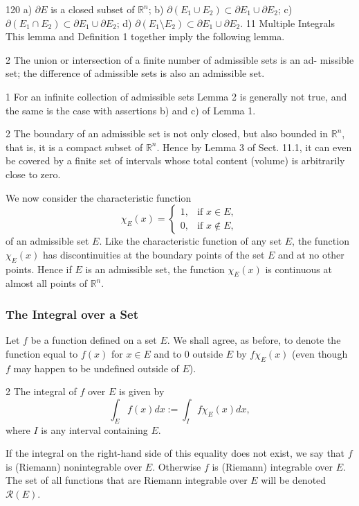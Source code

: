 120
a) $\partial E$ is a closed subset of $\mathbb{R}^n$;
b) $\partial(E_1 \cup E_2) \subset \partial E_1 \cup \partial E_2$;
c) $\partial(E_1 \cap E_2) \subset \partial E_1 \cup \partial E_2$;
d) $\partial(E_1 \setminus E_2) \subset \partial E_1 \cup \partial E_2$.
11 Multiple Integrals
This lemma and Definition 1 together imply the following lemma.
\begin{lemma}{2} The union or intersection of a finite number of admissible sets is an ad-
missible set; the difference of admissible sets is also an admissible set.
\end{lemma}
\begin{remark}{1} For an infinite collection of admissible sets Lemma 2 is generally not
true, and the same is the case with assertions b) and c) of Lemma 1.
\end{remark}
\begin{remark}{2} The boundary of an admissible set is not only closed, but also bounded
in $\mathbb{R}^n$, that is, it is a compact subset of $\mathbb{R}^n$. Hence by Lemma 3 of Sect. 11.1, it can
even be covered by a finite set of intervals whose total content (volume) is arbitrarily
close to zero.
\end{remark}
We now consider the characteristic function
$$\chi_E (x) = \begin{cases} 1, & \text{if } x \in E, \\ 0, & \text{if } x \notin E, \end{cases}$$
of an admissible set $E$. Like the characteristic function of any set $E$, the function
$\chi_E (x)$ has discontinuities at the boundary points of the set $E$ and at no other points.
Hence if $E$ is an admissible set, the function $\chi_E (x)$ is continuous at almost all points
of $\mathbb{R}^n$.
\subsubsection{The Integral over a Set}
Let $f$ be a function defined on a set $E$. We shall agree, as before, to denote the
function equal to $f(x)$ for $x \in E$ and to $0$ outside $E$ by $f \chi_E(x)$ (even though $f$
may happen to be undefined outside of $E$).
\begin{definition}{2} The integral of $f$ over $E$ is given by
$$\int_E f(x)dx := \int_I f \chi_E(x)dx,$$
where $I$ is any interval containing $E$.
\end{definition}
If the integral on the right-hand side of this equality does not exist, we say that $f$
is (Riemann) nonintegrable over $E$. Otherwise $f$ is (Riemann) integrable over $E$.
The set of all functions that are Riemann integrable over $E$ will be denoted $\mathcal{R}(E)$.
